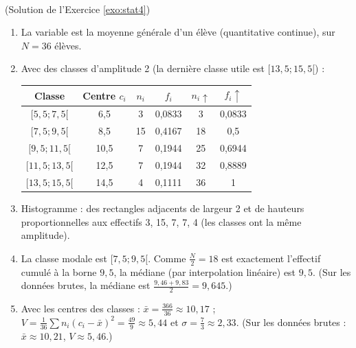 \begin{corrige}
\begin{sol} ~ \\
(Solution de l'Exercice \ref{exo:stat4})
\begin{enumerate}
\item La variable est la moyenne g\'en\'erale d'un \'el\`eve (quantitative continue), sur $N = 36$ \'el\`eves.
\item Avec des classes d'amplitude 2 (la derni\`ere classe utile est $[13,5 ; 15,5[$) :
      \begin{center}
      \begin{tabular}{|c|c|c|c|c|c|}
      \hline
      Classe & Centre $c_i$ & $n_i$ & $f_i$ & $n_i\uparrow$ & $f_i\uparrow$ \\
      \hline
      $[5,5 ; 7,5[$ & 6,5 & 3 & 0,0833 & 3 & 0,0833 \\
      $[7,5 ; 9,5[$ & 8,5 & 15 & 0,4167 & 18 & 0,5 \\
      $[9,5 ; 11,5[$ & 10,5 & 7 & 0,1944 & 25 & 0,6944 \\
      $[11,5 ; 13,5[$ & 12,5 & 7 & 0,1944 & 32 & 0,8889 \\
      $[13,5 ; 15,5[$ & 14,5 & 4 & 0,1111 & 36 & 1 \\
      \hline
      \end{tabular}
      \end{center}
\item Histogramme : des rectangles adjacents de largeur 2 et de hauteurs proportionnelles aux effectifs 3, 15, 7, 7, 4
      (les classes ont la m\^eme amplitude).
\item La classe modale est $[7,5 ; 9,5[$. Comme $\frac{N}{2} = 18$ est exactement l'effectif cumul\'e \`a la borne $9,5$,
      la m\'ediane (par interpolation lin\'eaire) est $9,5$. 
      (Sur les donn\'ees brutes, la m\'ediane est $\frac{9,46 + 9,83}{2} = 9,645$.)
\item Avec les centres des classes : $\bar{x} = \frac{366}{36} \approx 10,17$ ; 
      $V = \frac{1}{36}\sum n_i (c_i - \bar{x})^2 = \frac{49}{9} \approx 5,44$ et $\sigma = \frac{7}{3} \approx 2,33$.
      (Sur les donn\'ees brutes : $\bar{x} \approx 10,21$, $V \approx 5,46$.)
\end{enumerate}
\end{sol}


\end{corrige}
